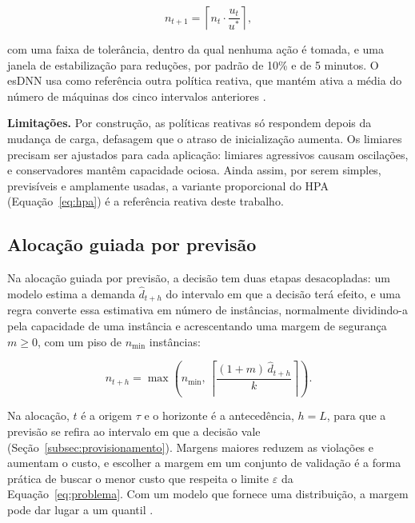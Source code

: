 \begin{equation}
\label{eq:hpa}
n_{t+1} = \left\lceil n_t \cdot \frac{u_t}{u^{*}} \right\rceil,
\end{equation}

\noindent com uma faixa de tolerância, dentro da qual nenhuma ação é tomada, e uma janela de estabilização para reduções, por padrão de 10\% e de 5 minutos. O esDNN usa como referência outra política reativa, que mantém ativa a média do número de máquinas dos cinco intervalos anteriores \cite{xu2022esdnn}.

\textbf{Limitações.} Por construção, as políticas reativas só respondem depois da mudança de carga, defasagem que o atraso de inicialização aumenta. Os limiares precisam ser ajustados para cada aplicação: limiares agressivos causam oscilações, e conservadores mantêm capacidade ociosa. Ainda assim, por serem simples, previsíveis e amplamente usadas, a variante proporcional do HPA (Equação~\ref{eq:hpa}) é a referência reativa deste trabalho.

\subsection{Alocação guiada por previsão}
\label{subsec:alocacao-preditiva}

Na alocação guiada por previsão, a decisão tem duas etapas desacopladas: um modelo estima a demanda $\hat{d}_{t+h}$ do intervalo em que a decisão terá efeito, e uma regra converte essa estimativa em número de instâncias, normalmente dividindo-a pela capacidade de uma instância e acrescentando uma margem de segurança $m \geq 0$, com um piso de $n_{\min}$ instâncias:

\begin{equation}
\label{eq:alocacao-margem}
n_{t+h} = \max\left(n_{\min},\, \left\lceil \frac{(1 + m)\, \hat{d}_{t+h}}{k} \right\rceil\right).
\end{equation}

\noindent Na alocação, $t$ é a origem $\tau$ e o horizonte é a antecedência, $h = L$, para que a previsão se refira ao intervalo em que a decisão vale (Seção~\ref{subsec:provisionamento}). Margens maiores reduzem as violações e aumentam o custo, e escolher a margem em um conjunto de validação é a forma prática de buscar o menor custo que respeita o limite $\varepsilon$ da Equação~\ref{eq:problema}. Com um modelo que fornece uma distribuição, a margem pode dar lugar a um quantil \cite{rossi2023forecasting, calheiros2015arima}.

